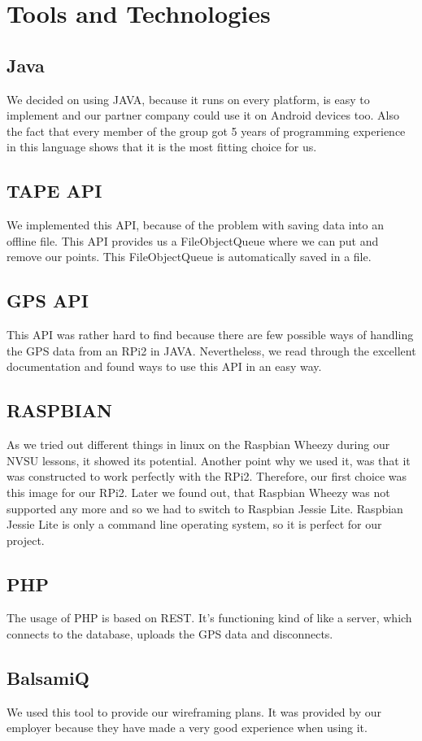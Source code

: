 \chapter{Tools and Technologies}
\section{Java}
We decided on using JAVA, because it runs on every platform, is easy to implement and our partner company could use it on Android devices too. Also the fact that every member of the group got 5 years of programming experience in this language shows that it is the most fitting choice for us.
\section{TAPE API}
We implemented this API, because of the problem with saving data into an offline file. This API provides us a FileObjectQueue where we can put and remove our points. This FileObjectQueue is automatically saved in a file.
\section{GPS API}
This API was rather hard to find because there are few possible ways of handling the GPS data from an RPi2 in JAVA. Nevertheless, we read through the excellent documentation and found ways to use this API in an easy way.
\section{RASPBIAN}
As we tried out different things in linux on the Raspbian Wheezy during our NVSU lessons, it showed its potential. Another point why we used it, was that it was constructed to work perfectly with the RPi2. Therefore, our first choice was this image for our RPi2. Later we found out, that Raspbian Wheezy was not supported any more and so we had to switch to Raspbian Jessie Lite. Raspbian Jessie Lite is only a command line operating system, so it is perfect for our project.
\section{PHP}
The usage of PHP is based on REST. It's functioning kind of like a server, which connects to the database, uploads the GPS data and disconnects.
\section{BalsamiQ}
We used this tool to provide our wireframing plans. It was provided by our employer because they have made a very good experience when using it.
